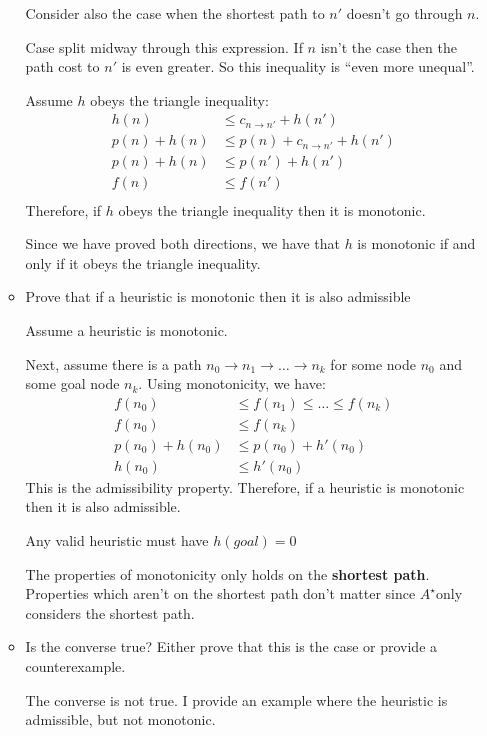 \documentclass[10pt,\jkfside,a4paper]{article}
\newcommand{\astar}{\ensuremath{A^\star}}
\begin{document}
\begin{enumerate}
\begin{itemize}
{\color{blue}
Consider also the case when the shortest path to $n'$ doesn't go through $n$.

Case split midway through this expression. If $n$ isn't the case then the
path cost to $n'$ is even greater. So this inequality is ``even more unequal''.
}

Assume $h$ obeys the triangle inequality:
\[
\begin{split}
h(n) &\le c_{n \to n'} + h(n') \\
p(n) + h(n) &\le p(n) + c_{n \to n'} + h(n') \\
p(n) + h(n) &\le p(n') + h(n') \\
f(n) &\le f(n') \\
\end{split}
\]
Therefore, if $h$ obeys the triangle inequality then it is monotonic.

Since we have proved both directions, we have that $h$ is monotonic if and
only if it obeys the triangle inequality.

\item Prove that if a heuristic is monotonic then it is also admissible

Assume a heuristic is monotonic.

Next, assume there is a path $n_0 \to n_1 \to \dots \to n_k$ for some
node $n_0$ and some goal node $n_k$. Using monotonicity, we have:
\[
\begin{split}
f(n_0) &\le f(n_1) \le \dots \le f(n_k) \\
f(n_0) &\le f(n_k) \\
p(n_0) + h(n_0) &\le p(n_0) + h'(n_0) \\
h(n_0) &\le h'(n_0)
\end{split}
\]
This is the admissibility property. Therefore, if a heuristic is monotonic
then it is also admissible.

{\color{blue}
Any valid heuristic must have $h(goal) = 0$

The properties of monotonicity only holds on the \textbf{shortest path}.
Properties which aren't on the shortest path don't matter since \astar only
considers the shortest path.
}

\item Is the converse true? Either prove that this is the case or provide a 
counterexample.

The converse is not true. I provide an example where the heuristic is
admissible, but not monotonic.


\end{itemize}
\end{enumerate}
\end{document}
